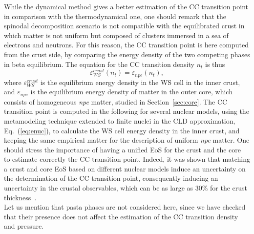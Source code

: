 While the dynamical method gives a better estimation of the CC transition point
in comparison with the thermodynamical one, one should remark that the spinodal
decomposition scenario is not compatible with the equilibrated crust in which
matter is not uniform but composed of clusters immersed in a sea of electrons
and neutrons. For this reason, the CC transition point is here computed from 
the crust side, by comparing the energy density of the two competing phases in 
beta equilibrium. The equation for the CC transition density $n_t$ is thus
%
\begin{equation}
\varepsilon_{WS}^{crust}(n_t) = \varepsilon_{npe}(n_t),
\end{equation}
%
where $\varepsilon_{WS}^{crust}$ is the equilibrium energy density in the WS
cell in the inner crust, and $\varepsilon_{npe}$ is the equilibrium energy
density of matter in the outer core, which consists of homogeneous \textit{npe} 
matter, studied in Section~\ref{sec:core}.
The CC transition point is computed in the following for several nuclear 
models, using the metamodeling technique extended to finite nuclei in the 
CLD approximation, Eq.~(\ref{eq:enuc}), to calculate the WS cell energy density in 
the inner crust, and keeping the same empirical matter for the description of 
uniform \textit{npe} matter. One should stress the importance of having a 
unified EoS for the crust and the core~\cite{Douchin2001} to estimate correctly 
the CC transition point. Indeed, it was shown that matching a crust and core
EoS based on different nuclear models induce an uncertainty on the determination 
of the CC transition point, consequently inducing an uncertainty in the crustal 
observables, which can be as large as $30\%$ for the crust
thickness~\cite{Fortin2016}.\\
Let us mention that pasta phases are not 
considered here, since we have checked that their presence does not 
affect the estimation of the CC transition density and pressure.

